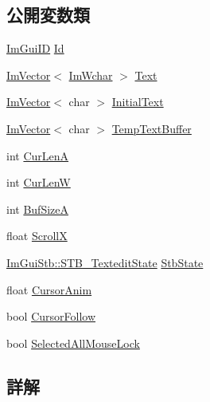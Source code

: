 \subsection*{公開変数類}
\begin{DoxyCompactItemize}
\item 
\mbox{\hyperlink{imgui_8h_a1785c9b6f4e16406764a85f32582236f}{Im\+Gui\+ID}} \mbox{\hyperlink{struct_im_gui_text_edit_state_a72607b084143b202b03fd495b0eded2c}{Id}}
\item 
\mbox{\hyperlink{class_im_vector}{Im\+Vector}}$<$ \mbox{\hyperlink{imgui_8h_af2c7badaf05a0008e15ef76d40875e97}{Im\+Wchar}} $>$ \mbox{\hyperlink{struct_im_gui_text_edit_state_a5c387aca48db34089a3c0ff251ff06fc}{Text}}
\item 
\mbox{\hyperlink{class_im_vector}{Im\+Vector}}$<$ char $>$ \mbox{\hyperlink{struct_im_gui_text_edit_state_aba698d67719db7a6954475292cf50d28}{Initial\+Text}}
\item 
\mbox{\hyperlink{class_im_vector}{Im\+Vector}}$<$ char $>$ \mbox{\hyperlink{struct_im_gui_text_edit_state_a299fd7f0af7c81eae119d304bd0beaca}{Temp\+Text\+Buffer}}
\item 
int \mbox{\hyperlink{struct_im_gui_text_edit_state_a007dc39101b6b1cfa78dcbad828b8659}{Cur\+LenA}}
\item 
int \mbox{\hyperlink{struct_im_gui_text_edit_state_aee70a14eaf9dfb09bee698aef2de40b2}{Cur\+LenW}}
\item 
int \mbox{\hyperlink{struct_im_gui_text_edit_state_a73190bd16bf8bb58c827e66b9e28e071}{Buf\+SizeA}}
\item 
float \mbox{\hyperlink{struct_im_gui_text_edit_state_ace66da7fa5fc21a7faabe2696d366e22}{ScrollX}}
\item 
\mbox{\hyperlink{struct_im_gui_stb_1_1_s_t_b___textedit_state}{Im\+Gui\+Stb\+::\+S\+T\+B\+\_\+\+Textedit\+State}} \mbox{\hyperlink{struct_im_gui_text_edit_state_a0fb9de6739de31f44ecffce8ad239a5e}{Stb\+State}}
\item 
float \mbox{\hyperlink{struct_im_gui_text_edit_state_a743c35c5d6559183f41e09e32ae967f4}{Cursor\+Anim}}
\item 
bool \mbox{\hyperlink{struct_im_gui_text_edit_state_add85da462dc5bbb0295ae28ebec2ec5d}{Cursor\+Follow}}
\item 
bool \mbox{\hyperlink{struct_im_gui_text_edit_state_adee23632ed1703c731651b163c1f481c}{Selected\+All\+Mouse\+Lock}}
\end{DoxyCompactItemize}


\subsection{詳解}


